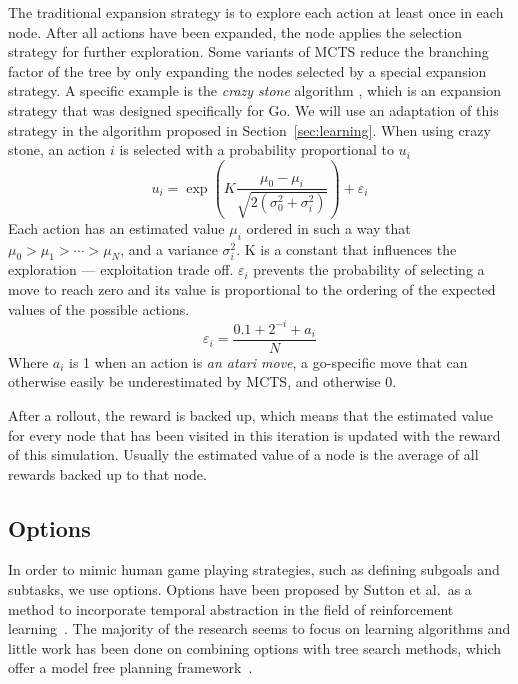 The traditional expansion strategy is to explore each action at least once in
each node. After all actions have been expanded, the node applies the selection
strategy for further exploration. Some variants of MCTS reduce the branching
factor of the tree by only expanding the nodes selected by a special expansion
strategy. A specific example is the \emph{crazy stone} algorithm
\cite{coulom2007efficient}, which is an expansion strategy that was designed
specifically for Go. We will use an adaptation of this strategy in the algorithm
proposed in Section~\ref{sec:learning}.  When using crazy stone, an action $i$
is selected with a probability proportional to $u_i$
\begin{equation}
	\label{eq:crazystone}
	u_i = \exp\left(K \frac{\mu_0 - \mu_i}{\sqrt{2\left(\sigma_0^2 +
\sigma_i^2\right)}}\right) + \varepsilon_i
\end{equation}
Each action has an estimated value $\mu_i$ ordered in such a way that $\mu_0 >
\mu_1 > \cdots > \mu_N$, and a variance $\sigma_i^2$. K is a constant
that influences the exploration --- exploitation trade off. $\varepsilon_i$ prevents
the probability of selecting a move to reach zero and its value is proportional
to the ordering of the expected values of the possible actions. 
\begin{equation}
	\label{eq:epsilon}
	\varepsilon_i = \frac{0.1 + 2^{-i} + a_i}{N}
\end{equation}
Where $a_i$ is 1 when an action is \emph{an atari move}, a go-specific
move that can otherwise easily be underestimated by MCTS, and otherwise 0.

After a rollout, the reward is backed up, which means that the estimated value
for every node that has been visited in this iteration is updated with the
reward of this simulation. Usually the estimated value of a node is the average
of all rewards backed up to that node.

\subsection{Options}
\label{subsec:options}

In order to mimic human game playing strategies, such as defining subgoals and
subtasks, we use options. Options have been proposed by Sutton et al.\ as a
method to incorporate temporal abstraction in the field of reinforcement
learning~\cite{sutton1999between}. The majority of the research seems to focus
on learning algorithms and little work has been done on combining options with
tree search methods, which offer a model free planning
framework~\cite{barto2003recent}.

